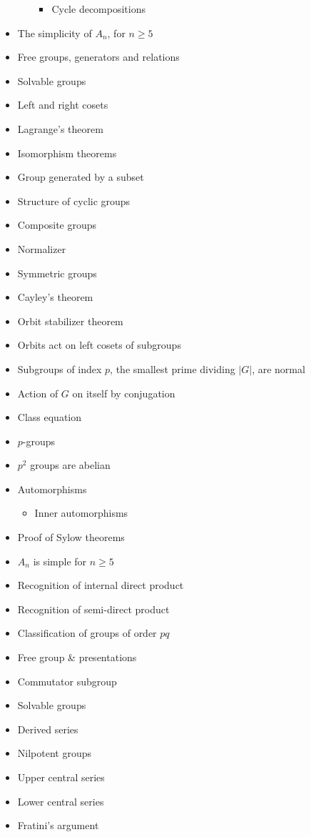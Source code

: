 \begin{itemize}
\begin{itemize}
    \begin{itemize}
    \tightlist
    \item
      Cycle decompositions
    \end{itemize}
  \end{itemize}
\item
  The simplicity of \(A_n\), for \(n \geq 5\)
\item
  Free groups, generators and relations
\item
  Solvable groups
\item
  Left and right cosets
\item
  Lagrange's theorem
\item
  Isomorphism theorems
\item
  Group generated by a subset
\item
  Structure of cyclic groups
\item
  Composite groups
\item
  Normalizer
\item
  Symmetric groups
\item
  Cayley's theorem
\item
  Orbit stabilizer theorem
\item
  Orbits act on left cosets of subgroups
\item
  Subgroups of index \(p\), the smallest prime dividing \(|G|\), are
  normal
\item
  Action of \(G\) on itself by conjugation
\item
  Class equation
\item
  \(p\)-groups
\item
  \(p^2\) groups are abelian
\item
  Automorphisms

  \begin{itemize}
  \tightlist
  \item
    Inner automorphisms
  \end{itemize}
\item
  Proof of Sylow theorems
\item
  \(A_n\) is simple for \(n\geq 5\)
\item
  Recognition of internal direct product
\item
  Recognition of semi-direct product
\item
  Classification of groups of order \(pq\)
\item
  Free group \& presentations
\item
  Commutator subgroup
\item
  Solvable groups
\item
  Derived series
\item
  Nilpotent groups
\item
  Upper central series
\item
  Lower central series
\item
  Fratini's argument
\end{itemize}

